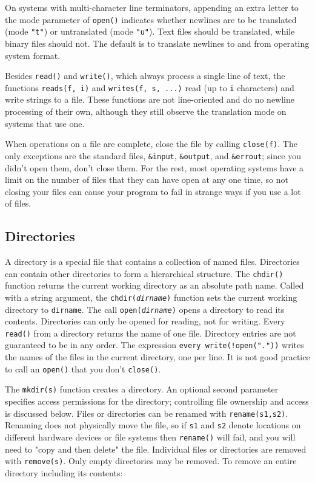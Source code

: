 On systems with multi-character line terminators, appending an
extra letter to the mode parameter of \texttt{open()} indicates whether
newlines are to be translated (mode
\texttt{"t"}) or untranslated (mode
\texttt{"u"}). Text files should
be translated, while binary files should not. The default is to translate
newlines to and from operating system format.

Besides \texttt{read()} and \texttt{write()}, which always process a
single line of text, the functions \texttt{reads(f, i)} and
\texttt{writes(f, s, ...)} read (up to \texttt{i} characters) and write
strings to a file. These functions are not line-oriented and do no
newline processing of their own, although they still observe the
translation mode on systems that use one.

When operations on a file are complete, close the file by calling
\texttt{close(f)}. The only exceptions are the standard
files, \texttt{\&input}, \texttt{\&output}, and \texttt{\&errout};
since you didn't open them, don't
close them. For the rest, most operating systems have a limit on the
number of files that they can have open at any one time, so not closing
your files can cause your program to fail in strange ways if you use a
lot of files.

\subsection{Directories}

A directory is a special file that contains a
collection of named files. Directories can contain other directories to
form a hierarchical structure. The \texttt{chdir()}
function returns the current working directory as an absolute path
name. Called with a string argument, the
\texttt{chdir(}\texttt{\textit{dirname}}\texttt{)} function sets the
current working directory to \texttt{dirname}. The call
\texttt{open(}\texttt{\textit{dirname}}\texttt{)} opens a directory to
read its contents. Directories can only be opened for reading,
not for writing. Every \texttt{read()} from a directory returns
the name of one file. Directory entries are not guaranteed to be in any
order. The expression \texttt{every
write(!open("."))} writes the names of the
files in the current directory, one per line. It is not good practice
to call an \texttt{open()} that you don't
\texttt{close()}.

The \texttt{mkdir(s)} function creates a directory. An
optional second parameter specifies access permissions for
the directory; controlling file ownership and access is discussed
below. Files or directories can be renamed with \texttt{rename(s1,s2)}.
Renaming does not physically move the file, so if \texttt{s1} and
\texttt{s2} denote locations on different hardware devices or file
systems then \texttt{rename()} will fail, and you will
need to "copy and then delete"
the file. Individual files or directories are removed with
\texttt{remove(s)}. Only empty directories may be
removed. To remove an entire directory including its contents:

